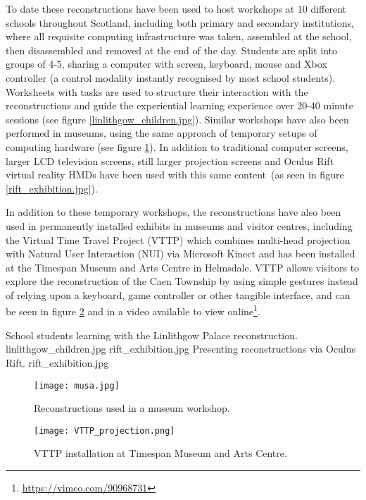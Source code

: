 To date these reconstructions have been used to host workshops at 10 different schools throughout Scotland, including both primary and secondary institutions, where all requisite computing infrastructure was taken, assembled at the school, then disassembled and removed at the end of the day. Students are split into groups of 4-5, sharing a computer with screen, keyboard, mouse and Xbox controller (a control modality instantly recognised by most school students). Worksheets with tasks are used to structure their interaction with the reconstructions and guide the experiential learning experience over 20-40 minute sessions (see figure \ref{linlithgow_children.jpg}). Similar workshops have also been performed in museums, using the same approach of temporary setups of computing hardware (see figure \ref{musa.jpg}). In addition to traditional computer screens, larger LCD television screens, still larger projection screens and Oculus Rift virtual reality HMDs have been used with this same content~(as seen in figure \ref{rift_exhibition.jpg}).

In addition to these temporary workshops, the reconstructions have also been used in permanently installed exhibits in museums and visitor centres, including the Virtual Time Travel Project (VTTP) which combines multi-head projection with Natural User Interaction (NUI) via Microsoft Kinect and has been installed at the Timespan Museum and Arts Centre in Helmsdale. VTTP allows visitors to explore the reconstruction of the Caen Township by using simple gestures instead of relying upon a keyboard, game controller or other tangible interface, and can be seen in figure \ref{VTTP_projection.png} and in a video available to view online\footnote{\url{https://vimeo.com/90968731}}.

 {School students learning with the Linlithgow Palace reconstruction.} {linlithgow_children.jpg}
       {rift_exhibition.jpg} {Presenting reconstructions via Oculus Rift.} {rift_exhibition.jpg}

\begin{figure}[h]
\centering
  \texttt{[image: musa.jpg]}
  \caption{Reconstructions used in a museum workshop.}
  \label{musa.jpg}
\end{figure}

\begin{figure}[h]
\centering
  \texttt{[image: VTTP\_projection.png]}
  \caption{VTTP installation at Timespan Museum and Arts Centre.}
  \label{VTTP_projection.png}
\end{figure}

